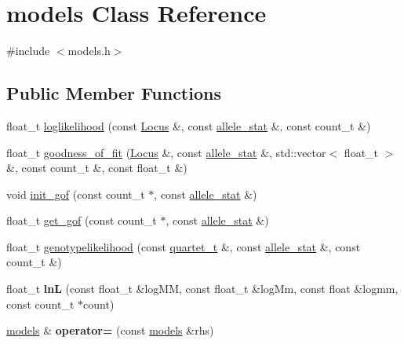 \hypertarget{classmodels}{\section{models Class Reference}
\label{classmodels}
}


{\ttfamily \#include $<$models.\-h$>$}

\subsection*{Public Member Functions}
\begin{DoxyCompactItemize}
\item 
float\-\_\-t \hyperlink{classmodels_a57d9f7de3f3d021007e8700cf4a07814}{loglikelihood} (const \hyperlink{classLocus}{Locus} \&, const \hyperlink{classallele__stat}{allele\-\_\-stat} \&, const count\-\_\-t \&)
\item 
float\-\_\-t \hyperlink{classmodels_a526bfb6a483fc01763a71dcf18f009c3}{goodness\-\_\-of\-\_\-fit} (\hyperlink{classLocus}{Locus} \&, const \hyperlink{classallele__stat}{allele\-\_\-stat} \&, std\-::vector$<$ float\-\_\-t $>$ \&, const count\-\_\-t \&, const float\-\_\-t \&)
\item 
void \hyperlink{classmodels_af1a44983f9f2a3473e0905182031fa03}{init\-\_\-gof} (const count\-\_\-t $\ast$, const \hyperlink{classallele__stat}{allele\-\_\-stat} \&)
\item 
float\-\_\-t \hyperlink{classmodels_a58b7ede52bb34e64c0ea80cdcc81be1e}{get\-\_\-gof} (const count\-\_\-t $\ast$, const \hyperlink{classallele__stat}{allele\-\_\-stat} \&)
\item 
float\-\_\-t \hyperlink{classmodels_a67c5d64baed8963d4306646e5e5be38d}{genotypelikelihood} (const \hyperlink{structquartet}{quartet\-\_\-t} \&, const \hyperlink{classallele__stat}{allele\-\_\-stat} \&, const count\-\_\-t \&)
\item 
\hypertarget{classmodels_a4c3e1316da574d7eab691e8dfd32c486}{float\-\_\-t {\bfseries ln\-L} (const float\-\_\-t \&log\-M\-M, const float\-\_\-t \&log\-Mm, const float \&logmm, const count\-\_\-t $\ast$count)}\label{classmodels_a4c3e1316da574d7eab691e8dfd32c486}

\item 
\hypertarget{classmodels_a33b232eed7d936124a470a2c87ffdc39}{\hyperlink{classmodels}{models} \& {\bfseries operator=} (const \hyperlink{classmodels}{models} \&rhs)}\label{classmodels_a33b232eed7d936124a470a2c87ffdc39}

\end{DoxyCompactItemize}


